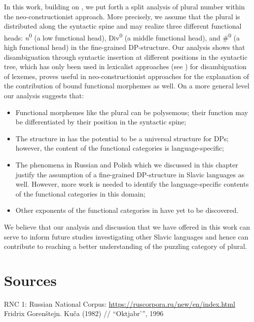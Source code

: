\documentclass[output=paper,colorlinks,citecolor=brown]{langscibook}
\begin{document}
In this work, building on \citet{Mathieu2014}, we put forth a split analysis of plural number within the neo-constructionist approach. More precisely, we assume that the plural is distributed along the syntactic spine and may realize three different functional heads: \textit{n}\textsuperscript{0}  (a low functional head), Div\textsuperscript{0} (a middle functional head), and  \#\textsuperscript{0} (a high functional head) in the fine-grained DP-structure. Our analysis shows that disambiguation through syntactic insertion at different positions in the syntactic tree, which has only been used in lexicalist approaches (see \citealt{Zimmermann2008}) for disambiguation of lexemes, proves useful in neo-constructionist approaches for the explanation of the contribution of bound functional morphemes as well. On a more general level our analysis suggests that: 

\begin{itemize}
  \item Functional morphemes like the plural can be polysemous; their function may be differentiated by their position in the syntactic spine;
  \item The structure in  has the potential to be a universal structure for DPs; however, the content of the functional categories is language-specific;
  \item The phenomena in Russian and Polish which we discussed in this chapter justify the assumption of a fine-grained DP-structure in Slavic languages as well. However, more work is needed to identify the language-specific contents of the functional categories in this domain; 
  \item Other exponents of the functional categories in  have yet to be discovered. 
\end{itemize}
	
We believe that our analysis and discussion that we have offered in this work can serve to inform future studies investigating other Slavic languages and hence can contribute to reaching a better understanding of the puzzling category of plural.


\section*{Sources} 

 RNC 1: Russian National Corpus: \url{https://ruscorpora.ru/new/en/index.html}\\ Fridrix Gorenštejn. Kuča (1982) // ``Oktjabr'{''}, 1996
 
\end{document}
